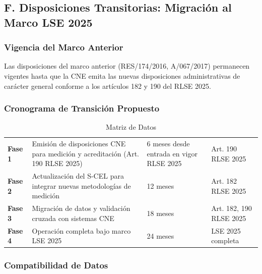 \documentclass{cel}
\begin{document}
\subsection{F. Disposiciones Transitorias: Migración al Marco LSE 2025}
\nopagebreak

\subsubsection{Vigencia del Marco Anterior}
\nopagebreak

Las disposiciones del marco anterior (RES/174/2016, A/067/2017) permanecen vigentes hasta que la CNE emita las nuevas disposiciones administrativas de carácter general conforme a los artículos 182 y 190 del RLSE 2025.


\vspace{0.4cm}
\subsubsection{Cronograma de Transición Propuesto}
\nopagebreak

\vspace{0.3cm}
\begin{tabladoradoLargo}
\renewcommand{\tabularxcolumn}[1]{p{#1}}
\begin{xltabular}{\textwidth}{|X|X|X|X|}
\caption{Matriz de Datos} \\
\toprule
{}  &  &  &  \\
\midrule
\endhead
\textbf{Fase 1} & Emisión de disposiciones CNE para medición y acreditación (Art. 190 RLSE 2025) & 6 meses desde entrada en vigor RLSE 2025 & Art. 190 RLSE 2025 \\ \hline
\textbf{Fase 2} & Actualización del S-CEL para integrar nuevas metodologías de medición & 12 meses & Art. 182 RLSE 2025 \\ \hline
\textbf{Fase 3} & Migración de datos y validación cruzada con sistemas CNE & 18 meses & Art. 182, 190 RLSE 2025 \\ \hline
\textbf{Fase 4} & Operación completa bajo marco LSE 2025 & 24 meses & LSE 2025 completa \\ \hline
\bottomrule
\end{xltabular}
\end{tabladoradoLargo}

\subsubsection{Compatibilidad de Datos}
\nopagebreak
\end{document}
